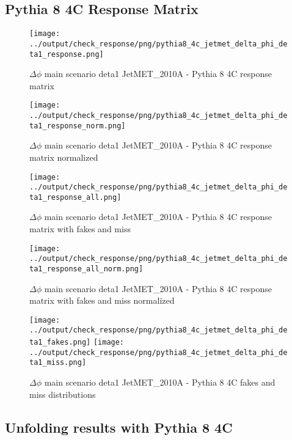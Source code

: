 \documentclass[11pt]{book}
\begin{document}
\clearpage
\subsection{Pythia 8 4C Response Matrix}


\begin{figure}[ht]
\centering
\texttt{[image: ../output/check\_response/png/pythia8\_4c\_jetmet\_delta\_phi\_deta1\_response.png]}
\caption{$\Delta\phi$ main scenario deta1 JetMET\_2010A - Pythia 8 4C response matrix}
\label{p8_jetmet_response}
\end{figure}

\begin{figure}[ht]
\centering
\texttt{[image: ../output/check\_response/png/pythia8\_4c\_jetmet\_delta\_phi\_deta1\_response\_norm.png]}
\caption{$\Delta\phi$ main scenario deta1 JetMET\_2010A - Pythia 8 4C response matrix normalized}
\label{p8_jetmet_delta_phi_deta1_response_norm}
\end{figure}

\begin{figure}[ht]
\centering
\texttt{[image: ../output/check\_response/png/pythia8\_4c\_jetmet\_delta\_phi\_deta1\_response\_all.png]}
\caption{$\Delta\phi$ main scenario deta1 JetMET\_2010A - Pythia 8 4C response matrix with fakes and miss}
\label{p8_jetmet_delta_phi_deta1_response_all}
\end{figure}

\begin{figure}[ht]
\centering
\texttt{[image: ../output/check\_response/png/pythia8\_4c\_jetmet\_delta\_phi\_deta1\_response\_all\_norm.png]}
\caption{$\Delta\phi$ main scenario deta1 JetMET\_2010A - Pythia 8 4C response matrix with fakes and miss normalized}
\label{p8_jetmet_delta_phi_deta1_response_all_norm}
\end{figure}

\begin{figure}[ht]
\centering
\texttt{[image: ../output/check\_response/png/pythia8\_4c\_jetmet\_delta\_phi\_deta1\_fakes.png]}
\texttt{[image: ../output/check\_response/png/pythia8\_4c\_jetmet\_delta\_phi\_deta1\_miss.png]}
\caption{$\Delta\phi$ main scenario deta1 JetMET\_2010A - Pythia 8 4C fakes and miss distributions}
\label{p8_jetmet_delta_phi_deta1_fakesmiss}
\end{figure}


\clearpage
\subsection{Unfolding results with Pythia 8 4C}
\end{document}
